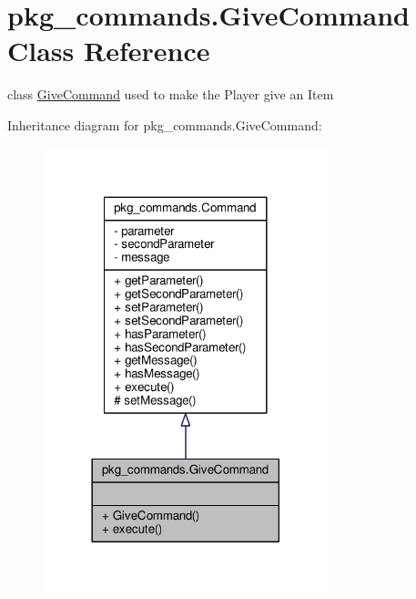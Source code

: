\hypertarget{classpkg__commands_1_1GiveCommand}{\section{pkg\-\_\-commands.\-Give\-Command Class Reference}
\label{classpkg__commands_1_1GiveCommand}
}


class \hyperlink{classpkg__commands_1_1GiveCommand}{Give\-Command} used to make the Player give an Item  




Inheritance diagram for pkg\-\_\-commands.\-Give\-Command\-:\nopagebreak
\begin{figure}[H]
\begin{center}
\leavevmode
\includegraphics[width=234pt]{classpkg__commands_1_1GiveCommand__inherit__graph}
\end{center}
\end{figure}


